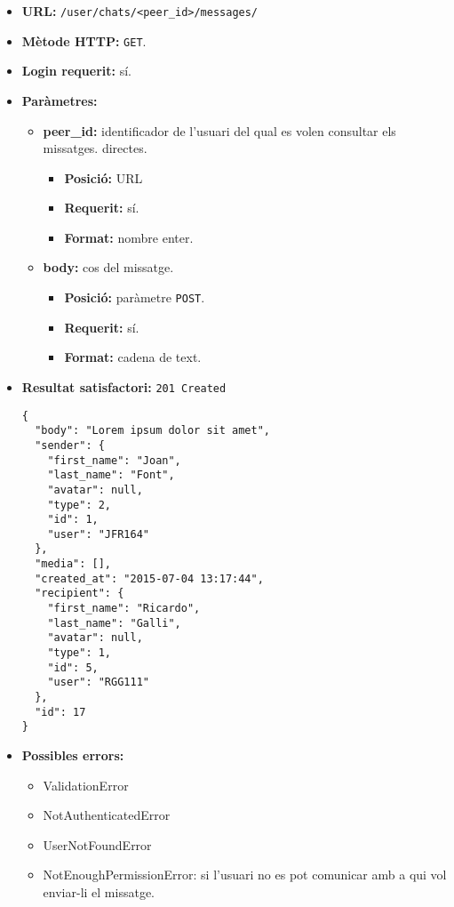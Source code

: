 	\begin{itemize}
	\item \textbf{\ac{URL}:} \texttt{/user/chats/<peer\_id>/messages/}
	\item \textbf{Mètode \ac{HTTP}: } \texttt{GET}.
	\item \textbf{Login requerit:} sí.
	\item \textbf{Paràmetres:}
	\begin{itemize}
		\item \textbf{peer\_id:} identificador de l'usuari del qual es volen consultar els missatges. directes.
		\begin{itemize}
			\item \textbf{Posició:} \ac{URL}
			\item \textbf{Requerit:} sí.
			\item \textbf{Format:} nombre enter.
		\end{itemize}
		\item \textbf{body:} cos del missatge.
		\begin{itemize}
			\item \textbf{Posició:} paràmetre \texttt{POST}.
			\item \textbf{Requerit:} sí.
			\item \textbf{Format:} cadena de text.
		\end{itemize}
	\end{itemize}
	\item \textbf{Resultat satisfactori:} \texttt{201 Created}
	\begin{verbatim}
{
  "body": "Lorem ipsum dolor sit amet",
  "sender": {
    "first_name": "Joan",
    "last_name": "Font",
    "avatar": null,
    "type": 2,
    "id": 1,
    "user": "JFR164"
  },
  "media": [],
  "created_at": "2015-07-04 13:17:44",
  "recipient": {
    "first_name": "Ricardo",
    "last_name": "Galli",
    "avatar": null,
    "type": 1,
    "id": 5,
    "user": "RGG111"
  },
  "id": 17
}
	\end{verbatim}
	\item \textbf{Possibles errors:}
	\begin{itemize}
		\item ValidationError
		\item NotAuthenticatedError
		\item UserNotFoundError
		\item NotEnoughPermissionError: si l'usuari no es pot comunicar amb a qui vol enviar-li el missatge.
	\end{itemize}
	\end{itemize}


